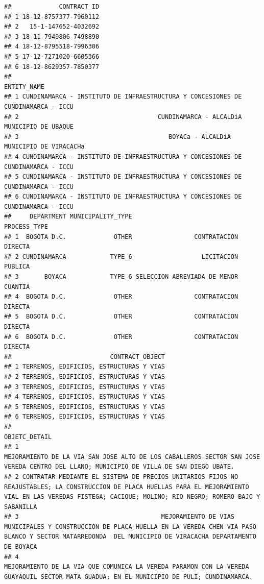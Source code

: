 \documentclass[
]{article}
\begin{document}
\begin{verbatim}
##             CONTRACT_ID
## 1 18-12-8757377-7960112
## 2   15-1-147652-4032692
## 3 18-11-7949806-7498890
## 4 18-12-8795518-7996306
## 5 17-12-7271020-6605366
## 6 18-12-8629357-7850377
##                                                                        ENTITY_NAME
## 1 CUNDINAMARCA - INSTITUTO DE INFRAESTRUCTURA Y CONCESIONES DE CUNDINAMARCA - ICCU
## 2                                      CUNDINAMARCA - ALCALDiA MUNICIPIO DE UBAQUE
## 3                                         BOYACa - ALCALDiA MUNICIPIO DE VIRACACHa
## 4 CUNDINAMARCA - INSTITUTO DE INFRAESTRUCTURA Y CONCESIONES DE CUNDINAMARCA - ICCU
## 5 CUNDINAMARCA - INSTITUTO DE INFRAESTRUCTURA Y CONCESIONES DE CUNDINAMARCA - ICCU
## 6 CUNDINAMARCA - INSTITUTO DE INFRAESTRUCTURA Y CONCESIONES DE CUNDINAMARCA - ICCU
##     DEPARTMENT MUNICIPALITY_TYPE                         PROCESS_TYPE
## 1  BOGOTA D.C.             OTHER                 CONTRATACION DIRECTA
## 2 CUNDINAMARCA            TYPE_6                   LICITACION PUBLICA
## 3       BOYACA            TYPE_6 SELECCION ABREVIADA DE MENOR CUANTIA
## 4  BOGOTA D.C.             OTHER                 CONTRATACION DIRECTA
## 5  BOGOTA D.C.             OTHER                 CONTRATACION DIRECTA
## 6  BOGOTA D.C.             OTHER                 CONTRATACION DIRECTA
##                           CONTRACT_OBJECT
## 1 TERRENOS, EDIFICIOS, ESTRUCTURAS Y VIAS
## 2 TERRENOS, EDIFICIOS, ESTRUCTURAS Y VIAS
## 3 TERRENOS, EDIFICIOS, ESTRUCTURAS Y VIAS
## 4 TERRENOS, EDIFICIOS, ESTRUCTURAS Y VIAS
## 5 TERRENOS, EDIFICIOS, ESTRUCTURAS Y VIAS
## 6 TERRENOS, EDIFICIOS, ESTRUCTURAS Y VIAS
##                                                                                                                                                                                                      OBJETC_DETAIL
## 1                                                                           MEJORAMIENTO DE LA VIA SAN JOSE ALTO DE LOS CABALLEROS SECTOR SAN JOSE VEREDA CENTRO DEL LLANO; MUNICIPIO DE VILLA DE SAN DIEGO UBATE.
## 2 CONTRATAR MEDIANTE EL SISTEMA DE PRECIOS UNITARIOS FIJOS NO REAJUSTABLES; LA CONSTRUCCION DE PLACA HUELLAS PARA EL MEJORAMIENTO VIAL EN LAS VEREDAS FISTEGA; CACIQUE; MOLINO; RIO NEGRO; ROMERO BAJO Y SABANILLA
## 3                                       MEJORAMIENTO DE VIAS MUNICIPALES Y CONSTRUCCION DE PLACA HUELLA EN LA VEREDA CHEN VIA PASO BLANCO Y SECTOR MATARREDONDA  DEL MUNICIPIO DE VIRACACHA DEPARTAMENTO DE BOYACA
## 4                                                                         MEJORAMIENTO DE LA VIA QUE COMUNICA LA VEREDA PARAMON CON LA VEREDA GUAYAQUIL SECTOR MATA GUADUA; EN EL MUNICIPIO DE PULI; CUNDINAMARCA.

\end{verbatim}
\end{document}
